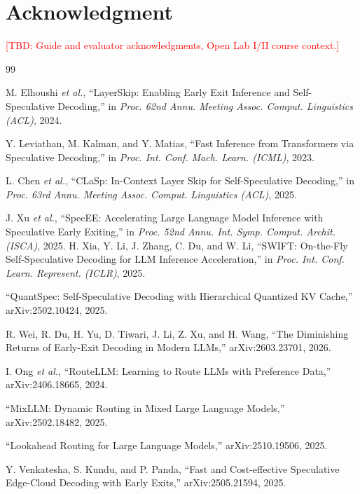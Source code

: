 \documentclass[journal]{IEEEtran}
\newcommand{\todo}[1]{\textcolor{red}{[TBD: #1]}}
\begin{document}
\section*{Acknowledgment}
\todo{Guide and evaluator acknowledgments, Open Lab I/II course context.}


\begin{thebibliography}{99}

 M. Elhoushi \emph{et al.}, ``LayerSkip: Enabling Early Exit Inference and Self-Speculative Decoding,'' in \emph{Proc. 62nd Annu. Meeting Assoc. Comput. Linguistics (ACL)}, 2024.

 Y. Leviathan, M. Kalman, and Y. Matias, ``Fast Inference from Transformers via Speculative Decoding,'' in \emph{Proc. Int. Conf. Mach. Learn. (ICML)}, 2023.

 L. Chen \emph{et al.}, ``CLaSp: In-Context Layer Skip for Self-Speculative Decoding,'' in \emph{Proc. 63rd Annu. Meeting Assoc. Comput. Linguistics (ACL)}, 2025.

 J. Xu \emph{et al.}, ``SpecEE: Accelerating Large Language Model Inference with Speculative Early Exiting,'' in \emph{Proc. 52nd Annu. Int. Symp. Comput. Archit. (ISCA)}, 2025.
 H. Xia, Y. Li, J. Zhang, C. Du, and W. Li, ``SWIFT: On-the-Fly Self-Speculative Decoding for LLM Inference Acceleration,'' in \emph{Proc. Int. Conf. Learn. Represent. (ICLR)}, 2025.

 ``QuantSpec: Self-Speculative Decoding with Hierarchical Quantized KV Cache,'' arXiv:2502.10424, 2025.

 R. Wei, R. Du, H. Yu, D. Tiwari, J. Li, Z. Xu, and H. Wang, ``The Diminishing Returns of Early-Exit Decoding in Modern LLMs,'' arXiv:2603.23701, 2026.

 I. Ong \emph{et al.}, ``RouteLLM: Learning to Route LLMs with Preference Data,'' arXiv:2406.18665, 2024.

 ``MixLLM: Dynamic Routing in Mixed Large Language Models,'' arXiv:2502.18482, 2025.

 ``Lookahead Routing for Large Language Models,'' arXiv:2510.19506, 2025.

 Y. Venkatesha, S. Kundu, and P. Panda, ``Fast and Cost-effective Speculative Edge-Cloud Decoding with Early Exits,'' arXiv:2505.21594, 2025.


\end{thebibliography}
\end{document}
